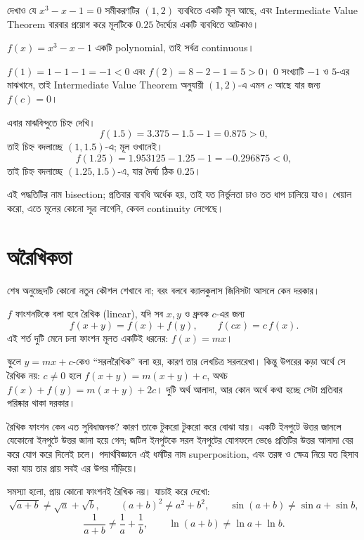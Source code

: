 \documentclass[11pt]{article}
\begin{document}
 দেখাও যে $x^{3} - x - 1 = 0$ সমীকরণটির $(1,2)$ ব্যবধিতে একটি মূল আছে,
এবং Intermediate Value Theorem বারবার প্রয়োগ করে মূলটিকে $0.25$ দৈর্ঘ্যের
একটি ব্যবধিতে আটকাও।

\begin{sol}
$f(x) = x^{3}-x-1$ একটি polynomial, তাই সর্বত্র continuous।

$f(1) = 1-1-1 = -1 < 0$ এবং $f(2) = 8-2-1 = 5 > 0$। $0$ সংখ্যাটি $-1$ ও $5$-এর
মাঝখানে, তাই Intermediate Value Theorem অনুযায়ী $(1,2)$-এ এমন $c$ আছে যার
জন্য $f(c) = 0$।

এবার মাঝবিন্দুতে চিহ্ন দেখি।
\[
  f(1.5) = 3.375 - 1.5 - 1 = 0.875 > 0 ,
\]
তাই চিহ্ন বদলাচ্ছে $(1, 1.5)$-এ; মূল ওখানেই।
\[
  f(1.25) = 1.953125 - 1.25 - 1 = -0.296875 < 0 ,
\]
তাই চিহ্ন বদলাচ্ছে $(1.25, 1.5)$-এ, যার দৈর্ঘ্য ঠিক $0.25$।

এই পদ্ধতিটির নাম bisection; প্রতিবার ব্যবধি অর্ধেক হয়, তাই যত নির্ভুলতা চাও
তত ধাপ চালিয়ে যাও। খেয়াল করো, এতে মূলের কোনো সূত্র লাগেনি, কেবল
continuity লেগেছে।
\end{sol}

\section{অরৈখিকতা}

শেষ অনুচ্ছেদটি কোনো নতুন কৌশল শেখাবে না; বরং বলবে ক্যালকুলাস জিনিসটা আসলে কেন
দরকার।

\begin{idea}[রৈখিক ফাংশন]
$f$ ফাংশনটিকে বলা হবে রৈখিক (linear), যদি সব $x, y$ ও ধ্রুবক $c$-এর জন্য
\[
  f(x+y) = f(x) + f(y), \qquad f(cx) = c\,f(x) .
\]
এই শর্ত দুটি মেনে চলা ফাংশন মূলত একটিই ধরনের: $f(x) = mx$।
\end{idea}

স্কুলে $y = mx + c$-কেও ``সরলরৈখিক'' বলা হয়, কারণ তার লেখচিত্র সরলরেখা।
কিন্তু উপরের কড়া অর্থে সে রৈখিক নয়: $c \neq 0$ হলে
$f(x+y) = m(x+y) + c$, অথচ $f(x)+f(y) = m(x+y) + 2c$। দুটি অর্থ আলাদা, আর কোন
অর্থে কথা হচ্ছে সেটা প্রতিবার পরিষ্কার থাকা দরকার।

রৈখিক ফাংশন কেন এত সুবিধাজনক? কারণ তাকে টুকরো টুকরো করে বোঝা যায়। একটি ইনপুটে
উত্তর জানলে যেকোনো ইনপুটে উত্তর জানা হয়ে গেল; জটিল ইনপুটকে সরল ইনপুটের যোগফলে
ভেঙে প্রতিটির উত্তর আলাদা বের করে যোগ করে দিলেই চলে। পদার্থবিজ্ঞানে এই ধর্মটির
নাম superposition, এবং তরঙ্গ ও ক্ষেত্র নিয়ে যত হিসাব করা যায় তার
প্রায় সবই এর উপর দাঁড়িয়ে।

সমস্যা হলো, প্রায় কোনো ফাংশনই রৈখিক নয়। যাচাই করে দেখো:
\[
  \sqrt{a+b} \neq \sqrt{a} + \sqrt{b}, \qquad
  (a+b)^{2} \neq a^{2}+b^{2}, \qquad
  \sin(a+b) \neq \sin a + \sin b ,
\]
\[
  \frac{1}{a+b} \neq \frac{1}{a} + \frac{1}{b}, \qquad
  \ln(a+b) \neq \ln a + \ln b .
\]
\end{document}
